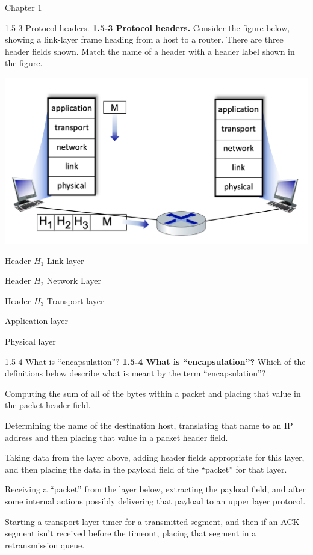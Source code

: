 \documentclass[a4paper]{article}
\begin{document}
\begin{quiz}{Chapter 1}
\begin{matching}[points=1,shuffle=true]{1.5-3 Protocol headers.}
\textbf{1.5-3 Protocol headers.}
Consider the figure below, showing a link-layer frame heading from a host to a router. There are three header fields shown. Match the name of a header with a header label shown in the figure. 
\begin{center}
\includegraphics[width=.9\linewidth]{figs/1.5.3.jpg}
\end{center}
\item Header $H_1$ \answer Link layer
\item Header $H_2$ \answer Network Layer
\item Header $H_3$ \answer Transport layer
\item \answer Application layer
\item \answer Physical layer
\end{matching}

\begin{multi}[points=1,shuffle=true]{1.5-4 What is ``encapsulation''?}
\textbf{1.5-4 What is ``encapsulation''?} 
Which of the definitions below describe what is meant by the term ``encapsulation''?
\item Computing the sum of all of the bytes within a packet and placing that value in the packet header field.
\item Determining the name of the destination host, translating that name to an IP address and then placing that value in a packet header field.
\item* Taking data from the layer above, adding header fields appropriate for this layer, and then placing the data in the payload field of the ``packet'' for that layer.
\item Receiving a ``packet'' from the layer below, extracting the payload field, and after some internal actions possibly delivering that payload to an upper layer protocol.
\item Starting a transport layer timer for a transmitted segment, and then if an ACK segment isn't received before the timeout, placing that segment in a retransmission queue.
\end{multi}


\end{quiz}
\end{document}
